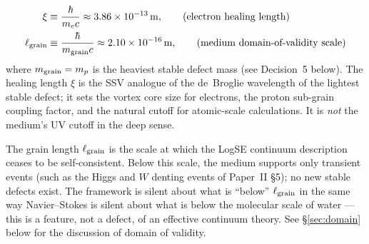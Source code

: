 \documentclass[11pt,a4paper]{article}
\begin{document}
\begin{decisionbox}
\begin{align}
    \xi              &\equiv \frac{\hbar}{m_e c}
                       \approx 3.86\times 10^{-13}\,\mathrm{m},
                       \tag{electron healing length} \\
    \ell_{\rm grain} &\equiv \frac{\hbar}{m_{\rm grain} c}
                       \approx 2.10\times 10^{-16}\,\mathrm{m},
                       \tag{medium domain-of-validity scale}
\end{align}
where $m_{\rm grain} = m_p$ is the heaviest stable defect mass (see
Decision~5 below).  The healing length $\xi$ is the SSV analogue of the
de~Broglie wavelength of the lightest stable defect; it sets the vortex
core size for electrons, the proton sub-grain coupling factor, and the
natural cutoff for atomic-scale calculations.  It is \emph{not} the
medium's UV cutoff in the deep sense.

The grain length $\ell_{\rm grain}$ is the scale at which the LogSE
continuum description ceases to be self-consistent.  Below this scale,
the medium supports only transient events (such as the Higgs and $W$
denting events of Paper~II \S5); no new stable defects exist.  The
framework is silent about what is ``below'' $\ell_{\rm grain}$ in the
same way Navier--Stokes is silent about what is below the molecular
scale of water --- this is a feature, not a defect, of an effective
continuum theory.  See \S\ref{sec:domain} below for the discussion of
domain of validity.
\end{decisionbox}
\end{document}
